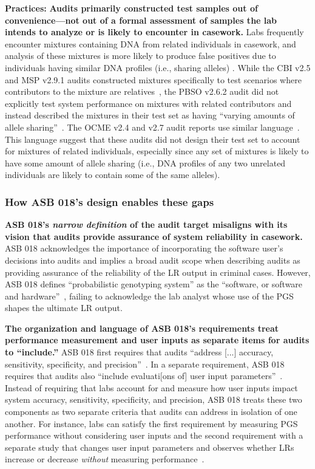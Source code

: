 \textbf{Practices:} \textbf{Audits primarily constructed test samples out of convenience---not out of a formal assessment of samples the lab intends to analyze or is likely to encounter in casework.} Labs frequently encounter mixtures containing DNA from related individuals in casework, and analysis of these mixtures is more likely to produce false positives due to individuals having similar DNA profiles (i.e., sharing alleles) \cite{kelly2022exploring}. While the CBI v2.5 and MSP v2.9.1 audits constructed mixtures specifically to test scenarios where contributors to the mixture are relatives~\cite{cbiIV, mspIV}, the PBSO v2.6.2 audit did not explicitly test system performance on mixtures with related contributors and instead described the mixtures in their test set as having ``varying amounts of allele sharing''~\cite[p.10]{pbsoIV}. The OCME v2.4 and v2.7 audit reports use similar language~\cite{ocmeIV, ocmeIV2.7}. This language suggest that these audits did not design their test set to account for mixtures of related individuals, especially since any set of mixtures is likely to have some amount of allele sharing (i.e., DNA profiles of any two unrelated individuals are likely to contain some of the same alleles). 


\subsubsection{How ASB 018's design enables these gaps}
\label{sec:scope-design}
\textbf{ASB 018's \textit{narrow definition} of the audit target misaligns with its vision that audits provide assurance of system reliability in casework.} ASB 018 acknowledges the importance of incorporating the software user's decisions into audits and implies a broad audit scope when describing audits as providing assurance of the reliability of the LR output in criminal cases. However, ASB 018 defines ``probabilistic genotyping system'' as the ``software, or software and hardware''~\cite[p.2]{asb018}, failing to acknowledge the lab analyst whose use of the PGS shapes the ultimate LR output. 

\textbf{The organization and language of ASB 018's requirements treat performance measurement and user inputs as separate items for audits to ``include.''} ASB 018 first requires that audits ``address [...] accuracy, sensitivity, specificity, and precision''~\cite[R4.1.3]{asb018}. In a separate requirement, ASB 018 requires that audits also ``include evaluati[ons of] user input parameters''~\cite[R4.1.4]{asb018}.  Instead of requiring that labs account for and measure how user inputs impact system accuracy, sensitivity, specificity, and precision, ASB 018 treats these two components as two separate criteria that audits can address in isolation of one another. For instance, labs can satisfy the first requirement by measuring PGS performance without considering user inputs and the second requirement with a separate study that changes user input parameters and observes whether LRs increase or decrease \textit{without} measuring performance~\cite{pbsoIV, mspIV}. 


